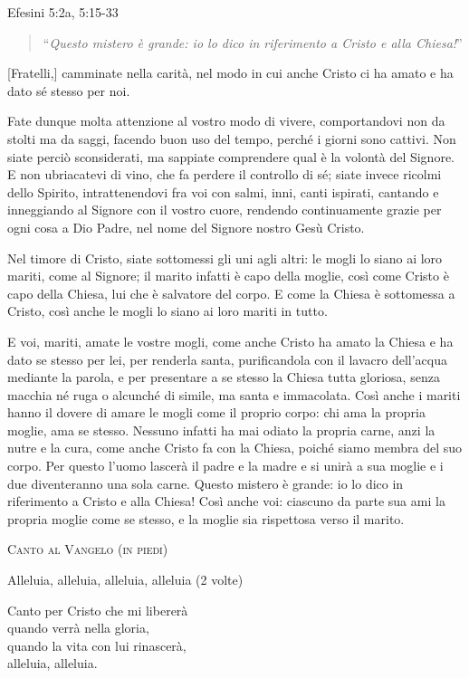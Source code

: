 \documentclass[12pt,twoside]{article}
\newcommand{\masssubpart}[1]{\bigskip

  {\large\scshape #1}}
\newcommand{\reading}[2]{#1\hdashrule{\fill}{1pt}{1pt}#2}
\newcommand{\readingquote}[1]{
\begin{quote}
``\textit{#1}''
\end{quote}
}
\begin{document}
\reading{Efesini 5:2a, 5:15-33}
\readingquote{Questo mistero è grande: io lo dico in riferimento a Cristo e alla Chiesa!}

[Fratelli,] camminate nella carità, nel modo in cui anche Cristo ci ha amato e ha dato sé stesso per noi.

Fate dunque molta attenzione al vostro modo di vivere, comportandovi non da stolti ma da saggi, facendo buon uso del tempo, perché i giorni sono cattivi. Non siate perciò sconsiderati, ma sappiate comprendere qual è la volontà del Signore. E non ubriacatevi di vino, che fa perdere il controllo di sé; siate invece ricolmi dello Spirito, intrattenendovi fra voi con salmi, inni, canti ispirati, cantando e inneggiando al Signore con il vostro cuore, rendendo continuamente grazie per ogni cosa a Dio Padre, nel nome del Signore nostro Gesù Cristo.

Nel timore di Cristo, siate sottomessi gli uni agli altri: le mogli lo siano ai loro mariti, come al Signore; il marito infatti è capo della moglie, così come Cristo è capo della Chiesa, lui che è salvatore del corpo. E come la Chiesa è sottomessa a Cristo, così anche le mogli lo siano ai loro mariti in tutto.

E voi, mariti, amate le vostre mogli, come anche Cristo ha amato la Chiesa e ha dato se stesso per lei, per renderla santa, purificandola con il lavacro dell'acqua mediante la parola, e per presentare a se stesso la Chiesa tutta gloriosa, senza macchia né ruga o alcunché di simile, ma santa e immacolata. Così anche i mariti hanno il dovere di amare le mogli come il proprio corpo: chi ama la propria moglie, ama se stesso. Nessuno infatti ha mai odiato la propria carne, anzi la nutre e la cura, come anche Cristo fa con la Chiesa, poiché siamo membra del suo corpo. Per questo l'uomo lascerà il padre e la madre e si unirà a sua moglie e i due diventeranno una sola carne. Questo mistero è grande: io lo dico in riferimento a Cristo e alla Chiesa! Così anche voi: ciascuno da parte sua ami la propria moglie come se stesso, e la moglie sia rispettosa verso il marito.

\masssubpart{Canto al Vangelo (in piedi)}

Alleluia, alleluia, alleluia, alleluia (2 volte)

Canto per Cristo che mi libererà\\
quando verrà nella gloria,\\
quando la vita con lui rinascerà,\\
alleluia, alleluia.
\end{document}
